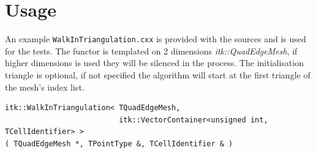 \documentclass{InsightArticle}
\begin{document}
\section{Usage}

An example \texttt{WalkInTriangulation.cxx} is provided with the sources and is used for the tests. The functor is templated on 2 dimensions \textit{itk::QuadEdgeMesh}, if higher dimensions is used they will be silenced in the process. The initialisation triangle is optional, if not specified the algorithm will start at the first triangle of the mesh's index list.
\begin{verbatim}
itk::WalkInTriangulation< TQuadEdgeMesh, 
                          itk::VectorContainer<unsigned int, TCellIdentifier> >
( TQuadEdgeMesh *, TPointType &, TCellIdentifier & )
\end{verbatim}


%
%



\end{document}
